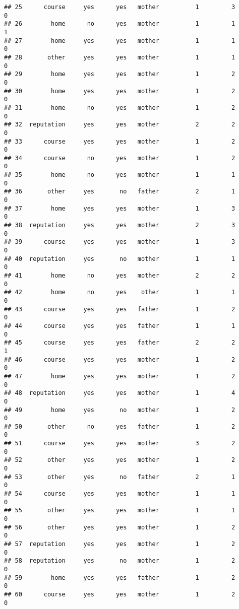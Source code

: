 \documentclass[]{article}
\begin{document}
\begin{verbatim}
## 25      course     yes      yes   mother          1         3        0
## 26        home      no      yes   mother          1         1        1
## 27        home     yes      yes   mother          1         1        0
## 28       other     yes      yes   mother          1         1        0
## 29        home     yes      yes   mother          1         2        0
## 30        home     yes      yes   mother          1         2        0
## 31        home      no      yes   mother          1         2        0
## 32  reputation     yes      yes   mother          2         2        0
## 33      course     yes      yes   mother          1         2        0
## 34      course      no      yes   mother          1         2        0
## 35        home      no      yes   mother          1         1        0
## 36       other     yes       no   father          2         1        0
## 37        home     yes      yes   mother          1         3        0
## 38  reputation     yes      yes   mother          2         3        0
## 39      course     yes      yes   mother          1         3        0
## 40  reputation     yes       no   mother          1         1        0
## 41        home      no      yes   mother          2         2        0
## 42        home      no      yes    other          1         1        0
## 43      course     yes      yes   father          1         2        0
## 44      course     yes      yes   father          1         1        0
## 45      course     yes      yes   father          2         2        1
## 46      course     yes      yes   mother          1         2        0
## 47        home     yes      yes   mother          1         2        0
## 48  reputation     yes      yes   mother          1         4        0
## 49        home     yes       no   mother          1         2        0
## 50       other      no      yes   father          1         2        0
## 51      course     yes      yes   mother          3         2        0
## 52       other     yes      yes   mother          1         2        0
## 53       other     yes       no   father          2         1        0
## 54      course     yes      yes   mother          1         1        0
## 55       other     yes      yes   mother          1         1        0
## 56       other     yes      yes   mother          1         2        0
## 57  reputation     yes      yes   mother          1         2        0
## 58  reputation     yes       no   mother          1         2        0
## 59        home     yes      yes   father          1         2        0
## 60      course     yes      yes   mother          1         2        0

\end{verbatim}
\end{document}
